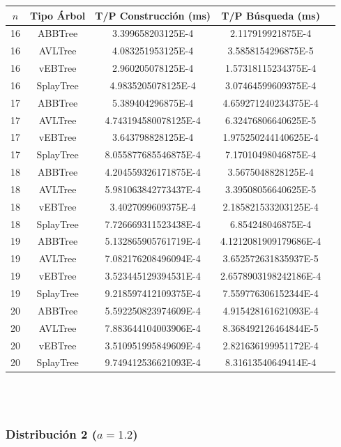 \documentclass[letterpaper,12pt]{article}
\begin{document}
\begin{tabular}{|c|c|c|c|c|}
\hline
\textbf{$n$} & \textbf{Tipo Árbol} & \textbf{T/P Construcción (ms)} & \textbf{T/P Búsqueda (ms)} \\
\hline
16 & ABBTree & 3.399658203125E-4 & 2.117919921875E-4 \\
\hline
16 & AVLTree & 4.083251953125E-4  & 3.5858154296875E-5 \\
\hline
16 & vEBTree & 2.960205078125E-4  & 1.57318115234375E-4 \\
\hline
16 & SplayTree & 4.9835205078125E-4 & 3.07464599609375E-4 \\
\hline
\hline
17 & ABBTree & 5.389404296875E-4  & 4.659271240234375E-4 \\
\hline
17 & AVLTree & 4.743194580078125E-4 & 6.32476806640625E-5 \\
\hline
17 & vEBTree & 3.643798828125E-4  & 1.975250244140625E-4\\
\hline
17 & SplayTree & 8.055877685546875E-4 & 7.17010498046875E-4 \\
\hline
\hline
18 & ABBTree & 4.204559326171875E-4 & 3.5675048828125E-4 \\
\hline
18 & AVLTree & 5.981063842773437E-4 & 3.39508056640625E-5 \\
\hline
18 & vEBTree & 3.4027099609375E-4 & 2.185821533203125E-4 \\
\hline
18 & SplayTree & 7.726669311523438E-4  & 6.854248046875E-4 \\
\hline
\hline
19 & ABBTree & 5.132865905761719E-4 & 4.1212081909179686E-4 \\
\hline
19 & AVLTree & 7.082176208496094E-4  & 3.652572631835937E-5 \\
\hline
19 & vEBTree & 3.523445129394531E-4 & 2.6578903198242186E-4\\
\hline
19 & SplayTree & 9.218597412109375E-4 & 7.559776306152344E-4 \\
\hline
\hline
20 & ABBTree & 5.592250823974609E-4 & 4.915428161621093E-4 \\
\hline
20 & AVLTree & 7.883644104003906E-4 & 8.368492126464844E-5 \\
\hline
20 & vEBTree & 3.510951995849609E-4 & 2.821636199951172E-4\\
\hline
20 & SplayTree & 9.749412536621093E-4 & 8.31613540649414E-4 \\
\hline
\end{tabular}
\\ \\

\subsubsection{Distribución 2 ($a=1.2$)}
\end{document}
